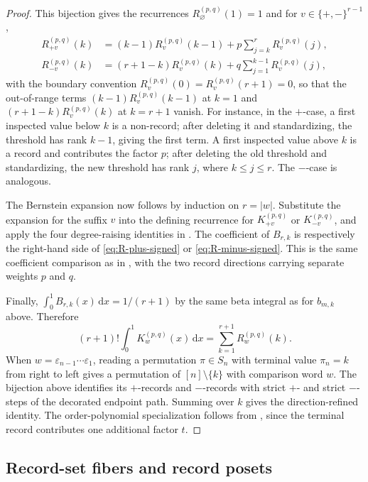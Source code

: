 \documentclass[11pt,letterpaper,reqno]{amsart}
\theoremstyle{definition}
\newcommand{\dd}{\,\mathrm{d}}
\newcommand{\eps}{\varepsilon}
\begin{document}
\begin{proof}
This bijection gives the recurrences $R_\varnothing^{(p,q)}(1)=1$ and for \(v\in\{+,-\}^{r-1}\),
\begin{align}
R_{+v}^{(p,q)}(k)
&=(k-1)R_v^{(p,q)}(k-1)
  +p\sum_{j=k}^{r}R_v^{(p,q)}(j),
\label{eq:R-plus-signed}\\
R_{-v}^{(p,q)}(k)
&=(r+1-k)R_v^{(p,q)}(k)
  +q\sum_{j=1}^{k-1}R_v^{(p,q)}(j),
\label{eq:R-minus-signed}
\end{align}
with the boundary convention \(R_v^{(p,q)}(0)=R_v^{(p,q)}(r+1)=0\), so that the
out-of-range terms \((k-1)R_v^{(p,q)}(k-1)\) at \(k=1\) and
\((r+1-k)R_v^{(p,q)}(k)\) at \(k=r+1\) vanish.  For instance, in the
\(+\)-case, a first inspected value below \(k\) is a
non-record; after deleting it and standardizing, the threshold has rank
\(k-1\), giving the first term.  A first inspected value above \(k\) is a
record and contributes the factor \(p\); after deleting the old threshold and
standardizing, the new threshold has rank \(j\), where \(k\le j\le r\).  The
\(-\)-case is analogous.

The Bernstein expansion now follows by induction on \(r=|w|\).  Substitute
the expansion for the suffix \(v\) into the defining recurrence for
\(K_{+v}^{(p,q)}\) or \(K_{-v}^{(p,q)}\), and apply the four degree-raising
identities in .  The coefficient of \(B_{r,k}\) is
respectively the right-hand side of \eqref{eq:R-plus-signed} or
\eqref{eq:R-minus-signed}.  This is the same coefficient comparison as in
, with the two record directions carrying separate
weights \(p\) and \(q\).

Finally, \(\int_0^1B_{r,k}(x)\dd x=1/(r+1)\) by the same beta integral as for
\(b_{m,k}\) above.  Therefore
\[
(r+1)!\int_0^1K_w^{(p,q)}(x)\dd x
=
\sum_{k=1}^{r+1}R_w^{(p,q)}(k).
\]
When \(w=\eps_{n-1}\cdots\eps_1\), reading a permutation
\(\pi\in S_n\) with terminal value \(\pi_n=k\) from right to left gives a
permutation of \([n]\setminus\{k\}\) with comparison word \(w\).  The bijection
above identifies its \(+\)-records and \(-\)-records with strict \(+\)- and
strict \(-\)-steps of the decorated endpoint path.  Summing over \(k\) gives
the direction-refined identity.  The order-polynomial specialization follows
from , since the terminal record contributes one additional
factor \(t\).
\end{proof}

\subsection{Record-set fibers and record posets}
\label{sec:record-set-fibers}
\end{document}
